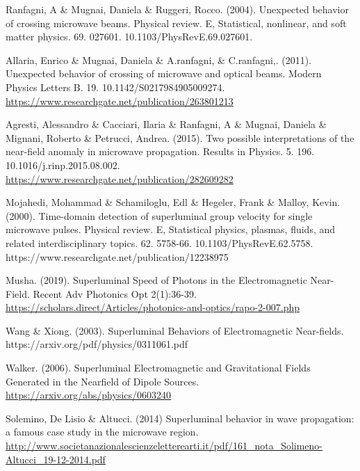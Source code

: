 \documentclass[twoside,final]{article}
\begin{document}
{\begin{thebibliography}{99}

 Ranfagni, A \& Mugnai, Daniela \& Ruggeri, Rocco. (2004).
Unexpected behavior of crossing microwave beams. Physical review. E,
Statistical, nonlinear, and soft matter physics. 69. 027601.
10.1103/PhysRevE.69.027601.

 Allaria, Enrico \& Mugnai, Daniela \& A.ranfagni, \& C.ranfagni,.
(2011). Unexpected behavior of crossing of microwave and optical beams. Modern
Physics Letters B. 19. 10.1142/S0217984905009274.
\href{https://www.researchgate.net/publication/263801213}{https://www.researchgate.net/publication/263801213}

 Agresti, Alessandro \& Cacciari, Ilaria \& Ranfagni, A \&
Mugnai, Daniela \& Mignani, Roberto \& Petrucci, Andrea. (2015). Two possible
interpretations of the near-field anomaly in microwave propagation. Results in
Physics. 5. 196. 10.1016/j.rinp.2015.08.002.\\
\url{https://www.researchgate.net/publication/282609282}

 Mojahedi, Mohammad \& Schamiloglu, Edl \& Hegeler, Frank
\& Malloy, Kevin. (2000). Time-domain detection of superluminal group velocity
for single microwave pulses. Physical review. E, Statistical physics, plasmas,
fluids, and related interdisciplinary topics. 62. 5758-66.
10.1103/PhysRevE.62.5758. https://www.researchgate.net/publication/12238975 

 Musha. (2019). Superluminal Speed of Photons in the
Electromagnetic Near-Field. Recent Adv Photonics Opt 2(1):36-39.\\
\url{https://scholars.direct/Articles/photonics-and-optics/rapo-2-007.php}

 Wang \& Xiong. (2003). Superluminal Behaviors of
Electromagnetic Near-fields. https://arxiv.org/pdf/physics/0311061.pdf 

 Walker. (2006). Superluminal Electromagnetic and
Gravitational Fields Generated in the Nearfield of Dipole Sources.\\
\url{https://arxiv.org/abs/physics/0603240}

 Solemino, De Lisio \& Altucci. (2014) Superluminal
behavior in wave propagation: a famous case study in the microwave region.\\
\url{
http://www.societanazionalescienzeletterearti.it/pdf/161\_nota\_Solimeno-Altucci\_19-12-2014.pdf
}    



\end{thebibliography}}
\end{document}
